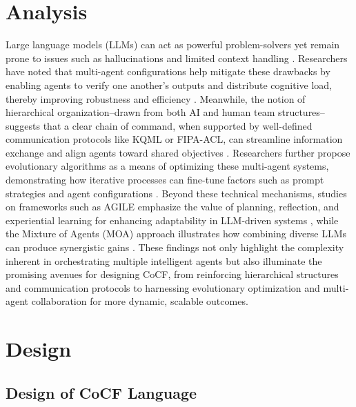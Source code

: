 \section{Analysis}
\label{sec:Analysis}

Large language models (LLMs) can act as powerful problem-solvers yet remain
prone to issues such as hallucinations and limited context handling
\cite{li2023camelcommunicativeagentsmind,yao2023reactsynergizingreasoningacting,wang_2024,schick2023toolformerlanguagemodelsteach}.
Researchers have noted that multi-agent configurations help mitigate these drawbacks
by enabling agents to verify one another's outputs and distribute cognitive load,
thereby improving robustness and efficiency
\cite{li2024agentsneed,wang2024mixtureofagentsenhanceslargelanguage,wu2024perhapshumantranslationharnessing,cheng2025selfplayingadversariallanguagegame}.
Meanwhile, the notion of hierarchical organization--drawn from both AI and human
team structures--suggests that a clear chain of command, when supported by well-defined
communication protocols like KQML or FIPA-ACL, can streamline information
exchange and align agents toward shared objectives
\cite{tao2024magisllmbasedmultiagentframework}. Researchers further propose evolutionary
algorithms as a means of optimizing these multi-agent systems, demonstrating how
iterative processes can fine-tune factors such as prompt strategies and agent
configurations \cite{akiba_2025}. Beyond these technical mechanisms, studies on
frameworks such as AGILE emphasize the value of planning, reflection, and
experiential learning for enhancing adaptability in LLM-driven systems
\cite{feng2024agilenovelreinforcementlearning}, while the Mixture of Agents (MOA)
approach illustrates how combining diverse LLMs can produce synergistic gains \cite{wang2024mixtureofagentsenhanceslargelanguage}.
These findings not only highlight the complexity inherent in orchestrating
multiple intelligent agents but also illuminate the promising avenues for
designing CoCF, from reinforcing hierarchical structures and communication protocols
to harnessing evolutionary optimization and multi-agent collaboration for more dynamic,
scalable outcomes.

\section{Design}
\label{sec:Design}

\subsection{Design of CoCF Language}

